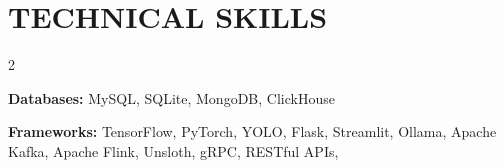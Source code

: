 \section*{TECHNICAL SKILLS}
\begin{multicols}{2}
\raggedright
{}\par\vspace{4pt}
{\headingfont\bfseries\color{navy}Databases: }{\normalfont\color{bodytext}MySQL, SQLite, MongoDB, ClickHouse}\par\vspace{4pt}
{\headingfont\bfseries\color{navy}Frameworks: }{\normalfont\color{bodytext}TensorFlow, PyTorch, YOLO, Flask, Streamlit, Ollama, Apache Kafka, Apache Flink, Unsloth, gRPC, RESTful APIs,}\par\vspace{4pt}
\end{multicols}

